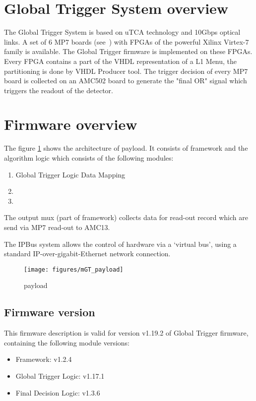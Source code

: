 \section{Global Trigger System overview}\label{sec:fw:gt_system}

The Global Trigger System is based on uTCA technology and 10Gbps optical links. A set of 6 MP7 boards (see~\cite{MP7}) with FPGAs of the powerful Xilinx Virtex-7 family is available. The Global Trigger firmware is implemented on these FPGAs. Every FPGA contains a part of the VHDL representation of a L1 Menu, the partitioning is done by VHDL Producer tool. The trigger decision of every MP7 board is collected on an AMC502 board to generate the "final OR" signal which triggers the readout of the detector.

\section{Firmware overview}\label{sec:fw:fw}
The figure \ref{fig:mgt} shows the architecture of \ugt payload. It consists of framework and the algorithm logic which consists of the following modules:
\begin{enumerate}
\item Global Trigger Logic Data Mapping
\item \ugtl
\item \ufdl
\end{enumerate}

The output mux (part of framework) collects data for read-out record which are send via MP7 read-out to AMC13.

The IPBus system allows the control of hardware via a ‘virtual bus’, using a standard IP-over-gigabit-Ethernet network connection.
\begin{figure}[h!]
   \centering
    \texttt{[image: figures/mGT\_payload]}
    \caption{\ugt payload}\label{fig:mgt}
 \end{figure}

\subsection{Firmware version}\label{sec:fw:fw_version}

This firmware description is valid for version v1.19.2 of Global Trigger firmware, containing the following module versions:
\begin{itemize}
\item Framework: v1.2.4
\item Global Trigger Logic: v1.17.1
\item Final Decision Logic: v1.3.6
\end{itemize}

